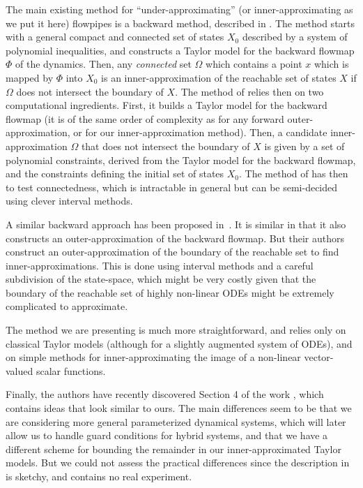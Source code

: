 \documentclass{sig-alternate-05-2015} %
\begin{document}
The main existing method for ``under-approximating'' (or inner-approximating as we put it 
here) flowpipes is a backward method, described in \cite{Underapproxflowpipes}. 
The method starts with a general
compact and connected 
set of states $X_0$ described by a system of polynomial inequalities, and constructs a Taylor
model for the backward flowmap $\Phi$ of the dynamics. Then, any {\em connected} set $\Omega$
which contains a point 
$x$ which is mapped by $\Phi$ into $X_0$ is an inner-approximation of the reachable set
of states $X$ if $\Omega$ does not intersect the boundary of 
$X$. The method of \cite{Underapproxflowpipes}
relies then on two computational ingredients. 
First, it builds a Taylor model for the backward flowmap (it is of the same order of complexity
as for any forward outer-approximation, or for our inner-approximation method). 
Then, a candidate inner-approximation $\Omega$ that does not intersect the boundary of $X$
is given by a set of polynomial constraints, derived
from the Taylor model for the backward flowmap, and the constraints defining the initial set
of states $X_0$. The method of \cite{Underapproxflowpipes} has then to test connectedness, which is intractable in general but
can be semi-decided using clever interval methods.

A similar backward approach %
has been proposed in~\cite{underapprox16}. It is similar in that it also constructs 
an outer-approximation of the backward flowmap. But their authors construct an outer-approximation
of the boundary of the reachable set to find inner-approximations. This is done using 
interval methods and a careful subdivision of the state-space, which might be very costly
given that the boundary of the reachable set of highly non-linear ODEs might be extremely 
complicated to approximate. 

The method we are presenting is much more straightforward, and relies only on classical
Taylor models (although for a slightly augmented system of ODEs), and on simple methods
for inner-approximating the image of a non-linear vector-valued scalar functions. 

Finally, the authors have recently discovered Section 4 of the work \cite{Gold06}, which
contains
ideas that look similar to ours. The main differences seem to be that we are considering more
general parameterized dynamical systems, which will later allow us to handle guard conditions for hybrid systems, 
and that we have a different scheme for bounding
the remainder in our inner-approximated Taylor models. But we could not assess the practical
differences since the description in \cite{Gold06} is sketchy, and contains no real experiment. 
\end{document}
